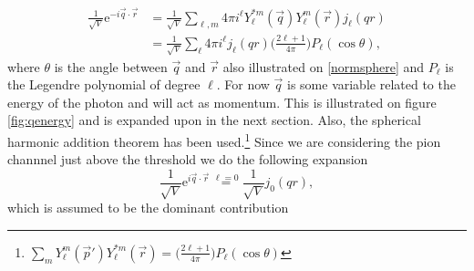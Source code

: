 \begin{align}
    \frac{1}{\sqrt{V}} \text{e}^{-i\vec{q}\cdot\vec{r}} &= \frac{1}{\sqrt{V}} \sum_{\ell,m} 4\pi i^\ell Y_\ell^{*m}(\vec{q})Y_\ell^m(\vec{r})j_\ell(qr) \\
    &= \frac{1}{\sqrt{V}} \sum_\ell 4\pi i^\ell j_\ell(qr) \bigg( \frac{2\ell+1}{4\pi}\bigg)P_\ell(\cos\theta),
\end{align}
where $\theta$ is the angle between $\vec{q}$ and $\vec{r}$ also illustrated on \ref{normsphere} and $P_\ell$ is the Legendre polynomial of degree $\ell$. For now $\vec{q}$ is some variable related to the energy of the photon and will act as momentum. This is illustrated on figure \ref{fig:qenergy} and is expanded upon in the next section. Also, the spherical harmonic addition theorem has been used.\footnote{$\sum_m Y_\ell^m(\vec{p}')Y_\ell^{*m}(\vec{r})=\big( \frac{2\ell+1}{4\pi}\big)P_\ell(\cos\theta)$} Since we are considering the pion channnel just above the threshold we do the following expansion
\begin{equation} \label{expansion}
\frac{1}{\sqrt{V}}\text{e}^{i\vec{q}\cdot \vec{r}} \stackrel{\ell=0}{=} \frac{1}{\sqrt{V}}j_0(qr),    
\end{equation}
which is assumed to be the dominant contribution
